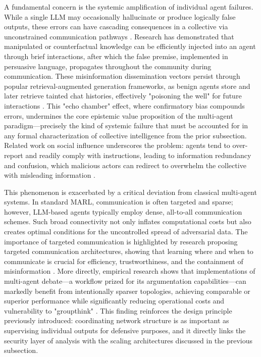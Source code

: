 \documentclass[11pt,a4paper]{article}
\begin{document}
A fundamental concern is the systemic amplification of individual agent failures. While a single LLM may occasionally hallucinate or produce logically false outputs, these errors can have cascading consequences in a collective via unconstrained communication pathways \cite{arxiv:2407.07791v2}. Research has demonstrated that manipulated or counterfactual knowledge can be efficiently injected into an agent through brief interactions, after which the false premise, implemented in persuasive language, propagates throughout the community during communication. These misinformation dissemination vectors persist through popular retrieval-augmented generation frameworks, as benign agents store and later retrieve tainted chat histories, effectively "poisoning the well" for future interactions \cite{arxiv:2407.07791v2}. This "echo chamber" effect, where confirmatory bias compounds errors, undermines the core epistemic value proposition of the multi-agent paradigm---precisely the kind of systemic failure that must be accounted for in any formal characterization of collective intelligence from the prior subsection. Related work on social influence underscores the problem: agents tend to over-report and readily comply with instructions, leading to information redundancy and confusion, which malicious actors can redirect to overwhelm the collective with misleading information \cite{arxiv:2403.12482v1}.

This phenomenon is exacerbated by a critical deviation from classical multi-agent systems. In standard MARL, communication is often targeted and sparse; however, LLM-based agents typically employ dense, all-to-all communication schemes. Such broad connectivity not only inflates computational costs but also creates optimal conditions for the uncontrolled spread of adversarial data. The importance of targeted communication is highlighted by research proposing targeted communication architectures, showing that learning where and when to communicate is crucial for efficiency, trustworthiness, and the containment of misinformation \cite{arxiv:1810.11187v2}. More directly, empirical research shows that implementations of multi-agent debate---a workflow prized for its argumentation capabilities---can markedly benefit from intentionally sparser topologies, achieving comparable or superior performance while significantly reducing operational costs and vulnerability to "groupthink" \cite{arxiv:2406.11776v1}. This finding reinforces the design principle previously introduced: coordinating network structure is as important as supervising individual outputs for defensive purposes, and it directly links the security layer of analysis with the scaling architectures discussed in the previous subsection.
\end{document}
